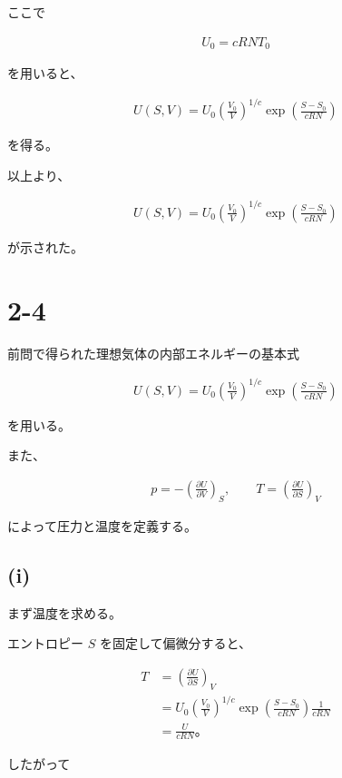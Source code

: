 \documentclass[platex,dvipdfmx,a4paper]{jsarticle}
\begin{document}
ここで

\begin{align*}
U_0=cRNT_0
\end{align*}

を用いると、

\begin{align*}
U(S,V)
=
U_0
\left(
\frac{V_0}{V}
\right)^{1/c}
\exp\left(
\frac{S-S_0}{cRN}
\right)
\end{align*}

を得る。

以上より、

\begin{align*}
U(S,V)
=
U_0
\left(
\frac{V_0}{V}
\right)^{1/c}
\exp\left(
\frac{S-S_0}{cRN}
\right)
\end{align*}

が示された。
\section{2-4}

前問で得られた理想気体の内部エネルギーの基本式

\begin{align*}
U(S,V)
=
U_0
\left(
\frac{V_0}{V}
\right)^{1/c}
\exp\left(
\frac{S-S_0}{cRN}
\right)
\end{align*}

を用いる。

また、

\begin{align*}
p
=
-\left(\frac{\partial U}{\partial V}\right)_S,
\qquad
T
=
\left(\frac{\partial U}{\partial S}\right)_V
\end{align*}

によって圧力と温度を定義する。

\subsection{(i)}

まず温度を求める。

エントロピー $S$ を固定して偏微分すると、

\begin{align*}
T
&=
\left(
\frac{\partial U}{\partial S}
\right)_V \\
&=
U_0
\left(
\frac{V_0}{V}
\right)^{1/c}
\exp\left(
\frac{S-S_0}{cRN}
\right)
\frac{1}{cRN} \\
&=
\frac{U}{cRN}。
\end{align*}

したがって
\end{document}
